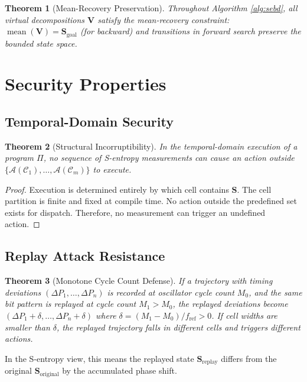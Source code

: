 \documentclass[twocolumn,11pt,a4paper]{article}
\newtheorem{theorem}{Theorem}[section]
\newcommand{\DP}{\Delta P}
\newcommand{\Stuple}{\mathbf{S}}
\newcommand{\calC}{\mathcal{C}}
\newcommand{\fref}{f_{\mathrm{ref}}}
\DeclareMathOperator{\mean}{mean}
\begin{document}
\begin{theorem}[Mean-Recovery Preservation]
Throughout Algorithm \ref{alg:sebd}, all virtual decompositions $\mathbf{V}$ satisfy the mean-recovery constraint: $\mean(\mathbf{V}) = \Stuple_{\text{goal}}$ (for backward) and transitions in forward search preserve the bounded state space.
\end{theorem}

\section{Security Properties}
\label{sec:security}

\subsection{Temporal-Domain Security}

\begin{theorem}[Structural Incorruptibility]
In the temporal-domain execution of a program $\Pi$, no sequence of S-entropy measurements can cause an action outside $\{\mathcal{A}(\calC_1), \ldots, \mathcal{A}(\calC_m)\}$ to execute.
\end{theorem}

\begin{proof}
Execution is determined entirely by which cell contains $\Stuple$. The cell partition is finite and fixed at compile time. No action outside the predefined set exists for dispatch. Therefore, no measurement can trigger an undefined action.
\end{proof}

\subsection{Replay Attack Resistance}

\begin{theorem}[Monotone Cycle Count Defense]
If a trajectory with timing deviations $(\DP_1, \ldots, \DP_n)$ is recorded at oscillator cycle count $M_0$, and the same bit pattern is replayed at cycle count $M_1 > M_0$, the replayed deviations become $(\DP_1 + \delta, \ldots, \DP_n + \delta)$ where $\delta = (M_1 - M_0)/\fref > 0$. If cell widths are smaller than $\delta$, the replayed trajectory falls in different cells and triggers different actions.
\end{theorem}

In the S-entropy view, this means the replayed state $\Stuple_{\text{replay}}$ differs from the original $\Stuple_{\text{original}}$ by the accumulated phase shift.
\end{document}

